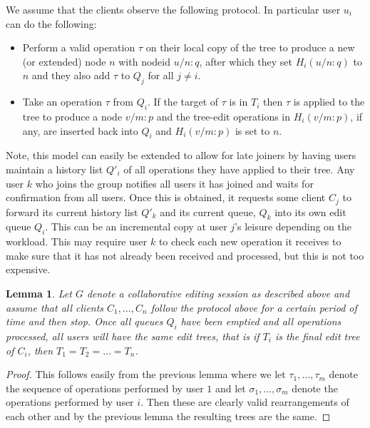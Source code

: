 \documentclass{amsart}
\newtheorem{lemma}[theorem]{Lemma}
\begin{document}
We assume that the clients observe the following protocol. 
In particular user $u_i$ can do the following:
\begin{itemize}
\item Perform a valid operation $\tau$ on their local copy of the tree to
produce a new (or extended) node $n$ with nodeid $u/n:q$,
after which they set $H_i(u/n:q)$ to $n$ and they also add $\tau$ to $Q_j$ for
all $j\ne i$.
\item Take an operation $\tau$ from $Q_i$. If the target of $\tau$ is
in $T_i$ then $\tau$ is applied to the tree to produce a node $v/m:p$
and the tree-edit operations in $H_i(v/m:p)$, if any, are inserted back into $Q_i$
 and $H_i(v/m:p)$ is set to $n$.
\end{itemize}
Note, this model can easily be extended to allow for late joiners by having users
maintain a history list $Q'_i$ of all operations they have applied to their tree.  Any user $k$ who joins the group notifies all users it has joined and waits for confirmation from all users. Once this is obtained, it 
requests some client $C_j$ to forward its current history list $Q'_k$ and its current queue, 
$Q_k$ into its own edit queue $Q_i$.
This can be an incremental copy at user $j$'s leisure depending
on the workload.  This may require user $k$ to check each new operation
it receives to make sure that it has not already been received and processed,
but this is not too expensive.

\begin{lemma}
Let $G$ denote a collaborative editing session as described
above and assume that all clients $C_1,\ldots,C_n$ follow the protocol above
for a certain period of time and then stop. Once all queues $Q_i$ have been
emptied and all operations processed, all users will have the same edit
trees, that is if $T_i$ is the final edit tree of $C_i$, then $T_1=T_2=\ldots=T_n$.
\end{lemma}

\begin{proof}
This follows easily from the previous lemma where we let $\tau_1,\ldots,\tau_m$
denote the sequence of operations performed by user $1$ and let 
$\sigma_1,\ldots,\sigma_m$ denote the operations performed by user $i$. Then
these are clearly valid rearrangements of each other and by the previous
lemma the resulting trees are the same.
\end{proof}
\end{document}
